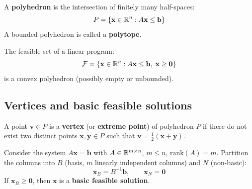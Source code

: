\begin{definition}[Polyhedron]
A \textbf{polyhedron} is the intersection of finitely many half-spaces:
\[
  P = \{\mathbf{x} \in \mathbb{R}^n : A\mathbf{x} \le \mathbf{b}\}
\]
A bounded polyhedron is called a \textbf{polytope}.
\end{definition}

\begin{theorem}
The feasible set of a linear program:
\[
  \mathcal{F} = \{\mathbf{x} \in \mathbb{R}^n : A\mathbf{x} \le \mathbf{b},\;
  \mathbf{x} \ge \mathbf{0}\}
\]
is a convex polyhedron (possibly empty or unbounded).
\end{theorem}

\begin{center}
\end{center}

\subsection{Vertices and basic feasible solutions}

\begin{definition}[Vertex]
A point $\mathbf{v} \in P$ is a \textbf{vertex} (or \textbf{extreme point})
of polyhedron $P$ if there do not exist two distinct points
$\mathbf{x}, \mathbf{y} \in P$ such that
$\mathbf{v} = \frac{1}{2}(\mathbf{x} + \mathbf{y})$.
\end{definition}

\begin{definition}
Consider the system $A\mathbf{x} = \mathbf{b}$ with
$A \in \mathbb{R}^{m \times n}$, $m \le n$, $\text{rank}(A) = m$.  Partition the
columns into $B$ (basis, $m$ linearly independent columns) and $N$
(non-basic):
\[
  \mathbf{x}_B = B^{-1}\mathbf{b}, \qquad \mathbf{x}_N = \mathbf{0}
\]
If $\mathbf{x}_B \ge \mathbf{0}$, then $\mathbf{x}$ is a \textbf{basic
feasible solution}.
\end{definition}

